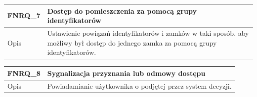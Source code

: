 \begin{table}[h!]
\begin{subtable}[c]{\textwidth}
                \centering
                 \begin{tabular}{|p{2cm}|p{12cm}|}
                    \hline FNRQ\_7      & \textbf{Dostęp do pomieszczenia za pomocą grupy identyfikatorów}  \\
                    \hline \cellcolor[gray]{0.8} Opis         & Ustawienie powiązań identyfikatorów i zamków w taki sposób, aby możliwy był dostęp do jednego zamka za pomocą grupy identyfikatorów. \\
                    \hline
                \end{tabular}
                \label{tbl:fnrq7}
                \vspace{10mm}           
            \end{subtable}
        \quad%
            \begin{subtable}[c]{\textwidth}
                \centering
                 \begin{tabular}{|p{2cm}|p{12cm}|}
                    \hline FNRQ\_8      & \textbf{Sygnalizacja przyznania lub odmowy dostępu}  \\
                    \hline \cellcolor[gray]{0.8} Opis         & Powiadamianie użytkownika o podjętej przez system decyzji. \\
                    \hline
                \end{tabular}
                \label{tbl:fnrq8}
                \vspace{10mm}           
            \end{subtable}
            \label{tbl:fnrq}
        \end{table}

